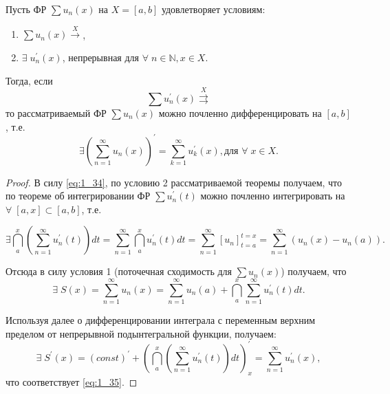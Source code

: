 
\begin{theorem}
	Пусть ФР $\sum u_n(x)$ на $X = [a,b]$ удовлетворяет условиям:
	\begin{enumerate}
		\item $\sum u_n(x) \overset{X}{\rightarrow}$,
		\item $\exists \; u_n^{'}(x)$, непрерывная для $\forall \; n \in \mathbb{N}, x \in X$.
	\end{enumerate}
	Тогда, если
    \begin{equation}
        \label{eq:1_34}
        \sum u_n^{'}(x) \overset{X}{\rightrightarrows}
    \end{equation}
    то рассматриваемый ФР $\sum u_n(x)$ можно почленно дифференцировать на $[a,b]$, т.е.
	\begin{equation}
	\label{eq:1_35}
	\exists \left( \sum_{n=1}^{\infty} u_n (x) \right)^{'} = \sum_{k=1}^{\infty} u_k^{'}(x), \text{для }\forall \; x \in X.
	\end{equation}
\end{theorem}
\begin{proof}
	В силу \eqref{eq:1_34}, по условию 2 рассматриваемой теоремы получаем, что по теореме об интегрировании ФР $\sum u_n^{'}(t)$ можно почленно интегрировать на
    	$\forall \; [a,x] \subset [a,b]$, \nolinebreak т.е.

    \begin{equation*}
        \exists \dint\limits_a^x \left(\sum\limits_{n=1}^{\infty} u_n^{'}(t)\right)dt = \sum_{n=1}^{\infty} \dint\limits_a^x u_n^{'}(t)dt = \sum_{n=1}^{\infty} [u_n]^{t = x}_{t = a} = \sum\limits_{n=1}^{\infty}\left(u_n(x) - u_n(a)\right).
    \end{equation*}

	Отсюда в силу условия 1 (поточечная сходимость для $\sum u_n(x)$) получаем, что
    \begin{equation*}
            \exists \; S(x) = \sum\limits_{n=1}^{\infty} u_n(x) = \sum\limits_{n=1}^{\infty}u_n(a) + \dint\limits_a^x \sum\limits_{n=1}^{\infty}u_n^{'}(t)dt.
    \end{equation*}

	Используя далее  о дифференцировании интеграла с переменным верхним пределом от непрерывной подынтегральной функции, получаем:\\
	\begin{equation*}
	\exists \; S^{'}(x) = (const)^{'} + \left(\dint\limits_a^x \left( \sum\limits_{n=1}^{\infty} u_n^{'} (t) \right)dt \right)^{'}_x = \sum\limits_{n=1}^{\infty}u_n^{'} (x),
	\end{equation*} что соответствует \eqref{eq:1_35}.
\end{proof}
